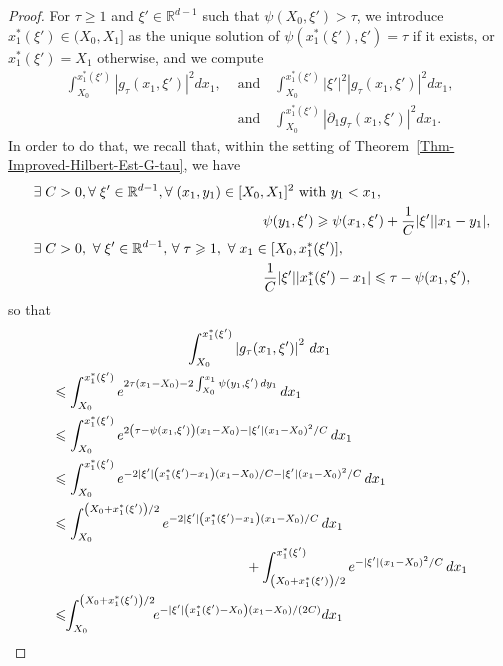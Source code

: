 \documentclass[10pt]{amsart}
\theoremstyle{definition}\newtheorem{defi}[theo]{Definition}\newtheorem{rema}[theo]{Remark}\newtheorem{exam}[theo]{Example}\newtheorem{exem}[theo]{Example}\newtheorem{nota}[theo]{Notation}
\newcommand*\R{\mathbb{R}}
\renewcommand{\leq}{\leqslant}
\renewcommand{\geq}{\geqslant}
\let\oldexists\exists
\renewcommand*{\exists}{\mathrel{\oldexists}}
\let\oldforall\forall
\renewcommand*{\forall}{\mathrel{\oldforall}}
\begin{document}
\begin{proof}
For $\tau \geq 1$ and $\xi' \in \R^{d-1}$ such that $\psi(X_0, \xi') > \tau$, we introduce $x_1^*(\xi') \in (X_0, X_1]$ as the unique solution of $\psi(x_1^*(\xi'), \xi') = \tau$ if it exists, or $x_1^*(\xi') = X_1$ otherwise, and we compute
\pagebreak
\begin{align*}
\int_{X_0}^{x_1^*(\xi')} \left|g_\tau(x_1, \xi')\right|^2 dx_1,
&\text{ and}
\quad
\int_{X_0}^{x_1^*(\xi')} |\xi'|^2 \left|g_\tau(x_1, \xi')\right|^2 dx_1,\\
&\text{ and} 
\quad
\int_{X_0}^{x_1^*(\xi')} \left|\partial_1 g_\tau(x_1, \xi')\right|^2 dx_1.
\end{align*}
In order to do that, we recall that, within the setting of Theorem~\ref{Thm-Improved-Hilbert-Est-G-tau}, we have
\begin{align*}
&\exists C > 0, \forall \xi' \in  \R^{d-1}, \forall (x_1,y_1)  \in  [ X_0, X_1 ]^2\text{ with } y_1  <  x_1,
\\
&\mkern300mu \psi(y_1, \xi') \geq  \psi(x_1, \xi')  + \frac{1}{C} |\xi'| |x_1  -  y_1|,
\\
&
\exists C>0, \ \forall \xi' \in \R^{d-1},\, \forall \tau \geq 1, \ \forall x_1 \in [X_0, x_1^*(\xi')],\\
&\mkern300mu
\frac{1}{C} |\xi'| |x_1^*(\xi') - x_1| \leq \tau - \psi(x_1, \xi'),
\end{align*}
so that
\begin{multline*}
\int_{X_0}^{x_1^*(\xi')} \left|g_\tau(x_1, \xi')\right|^2 \, dx_1\\
\begin{aligned}
&\leq
\int_{X_0}^{x_1^*(\xi')} e^{2 \tau (x_1 -X_0) - 2 \int_{X_0}^{x_1} \psi(y_1, \xi') \, dy_1 } \, dx_1
\\
& \leq
\int_{X_0}^{x_1^*(\xi')} e^{2 \left(\tau - \psi(x_1, \xi')\right) (x_1 -X_0) - |\xi'| (x_1- X_0)^2/C } \, dx_1
\\
& \leq
\int_{X_0}^{x_1^*(\xi')} e^{- 2 |\xi'| \left(x_1^*(\xi') - x_1\right) (x_1 -X_0)/C - |\xi'| (x_1- X_0)^2/C} \, dx_1
\\
& \leq
\int_{X_0}^{\left(X_0+x_1^*(\xi')\right)/2}e^{- 2|\xi'| \left(x_1^*(\xi') - x_1\right) (x_1 -X_0)/C } \, dx_1 \\
&\mkern250mu+
\int_{\left(X_0+x_1^*(\xi')\right)/2}^{x_1^*(\xi')} e^{ - |\xi'| (x_1- X_0)^2/C} \, dx_1
\\
& \leq \!\!
\int_{X_0}^{\left(X_0+x_1^*(\xi')\right)/2}\!\!e^{- |\xi'| \left(x_1^*(\xi') - X_0\right) (x_1 -X_0)/(2C)} dx_1 
\\

\end{aligned}
\end{multline*}
\end{proof}
\end{document}
